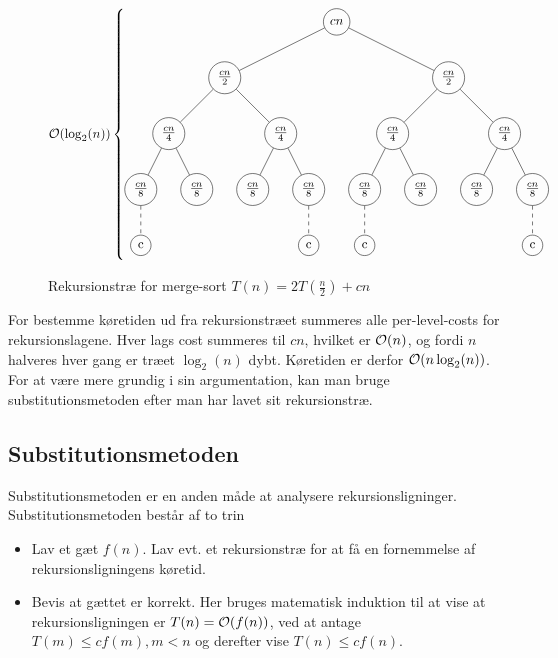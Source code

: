 \begin{figure}[h!]
  \caption{Rekursionstræ for merge-sort $T(n) = 2T(\frac{n}{2}) + cn$}
  \begin{equation*}
    \O(\log_2(n))\left \{
      \begin{gathered}
        \begin{tikzpicture}[every node/.style = {shape=circle, draw, align=center}, level distance=1.5cm,
          level 1/.style={sibling distance=6cm},
          level 2/.style={sibling distance=3cm},
          level 3/.style={sibling distance=1.5cm},
          emph/.style={edge from parent/.style={dashed,draw}}]
          \node(A) at (0, 0) {$cn$}
          child { node {$\frac{cn}{2}$}
            child { node {$\frac{cn}{4}$}
              child { node {$\frac{cn}{8}$}
                child[emph] { node {c} }}
              child { node {$\frac{cn}{8}$} }}
            child { node {$\frac{cn}{4}$}
              child { node {$\frac{cn}{8}$} }
              child { node {$\frac{cn}{8}$}
                child[emph] { node {c} }}}}
          child { node {$\frac{cn}{2}$}
            child { node {$\frac{cn}{4}$}
              child { node {$\frac{cn}{8}$}
                child[emph] { node {c} }}
              child { node {$\frac{cn}{8}$} }}
            child { node {$\frac{cn}{4}$}
              child { node {$\frac{cn}{8}$} }
              child { node {$\frac{cn}{8}$}
                child[emph] { node {c} }}}};
        \end{tikzpicture}
      \end{gathered}
    \right.
  \end{equation*}
\end{figure}

For bestemme køretiden ud fra rekursionstræet summeres alle per-level-costs for rekursionslagene. Hver lags cost summeres til $cn$, hvilket er $\mathcal{O}(n)$, og fordi $n$ halveres hver gang er træet $\log_2(n)$ dybt. Køretiden er derfor $\mathcal{O}(n\log_2(n))$. For at være mere grundig i sin argumentation, kan man bruge substitutionsmetoden efter man har lavet sit rekursionstræ.
\subsection{Substitutionsmetoden}
Substitutionsmetoden er en anden måde at analysere rekursionsligninger. Substitutionsmetoden består af to trin
\begin{itemize}
\item Lav et gæt $f(n)$. Lav evt. et rekursionstræ for at få en fornemmelse af rekursionsligningens køretid.
\item Bevis at gættet er korrekt. Her bruges matematisk induktion til at vise at rekursionsligningen er $T(n) = \mathcal{O}(f(n))$, ved at antage $T(m) \leq cf(m), m < n$ og derefter vise $T(n) \leq cf(n)$.
\end{itemize}

